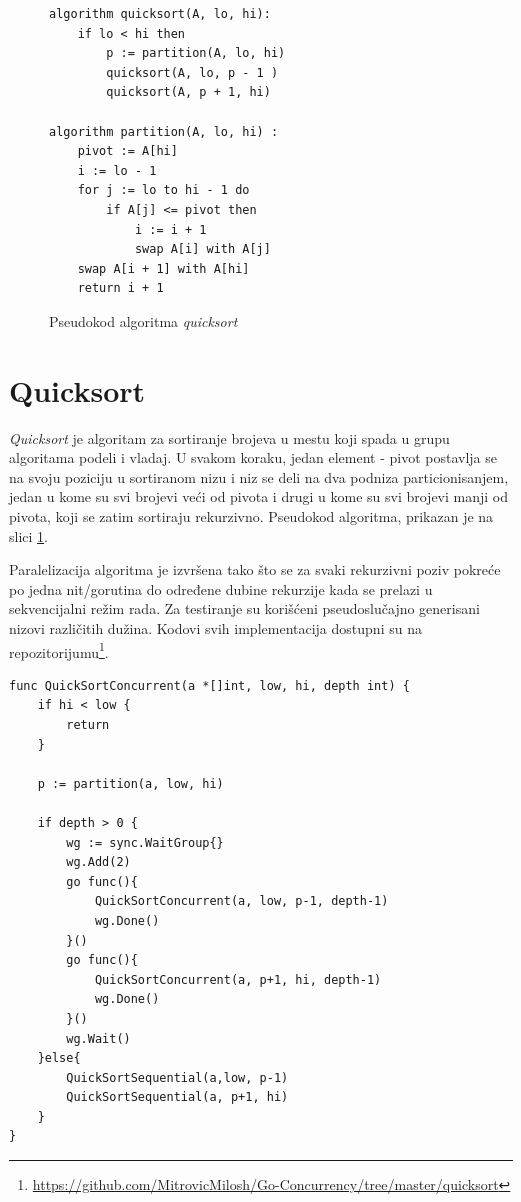 \documentclass[12pt,oneside]{memoir}
\begin{document}
\begin{figure}
\begin{center}

\begin{Verbatim}[fontsize=\small]
algorithm quicksort(A, lo, hi):
    if lo < hi then
        p := partition(A, lo, hi)
        quicksort(A, lo, p - 1 )
        quicksort(A, p + 1, hi)

algorithm partition(A, lo, hi) :
    pivot := A[hi]
    i := lo - 1    
    for j := lo to hi - 1 do
        if A[j] <= pivot then
            i := i + 1
            swap A[i] with A[j]
    swap A[i + 1] with A[hi]
    return i + 1
\end{Verbatim}

\caption{Pseudokod algoritma \textit{quicksort}}
\label{fig:qs_pseudo}
\end{center}
\end{figure}

\section{Quicksort}
\textit{Quicksort} je algoritam za sortiranje brojeva u mestu koji spada u grupu algoritama podeli i vladaj. U svakom koraku, jedan element - pivot postavlja se na svoju poziciju u sortiranom nizu i niz se deli na dva podniza particionisanjem, jedan u kome su svi brojevi veći od pivota i drugi u kome su svi brojevi manji od pivota, koji se zatim sortiraju rekurzivno.  Pseudokod algoritma, prikazan je na slici \ref{fig:qs_pseudo}. 

Paralelizacija algoritma je izvršena tako što se za svaki rekurzivni poziv pokreće po jedna nit/gorutina do određene dubine rekurzije kada se prelazi u sekvencijalni režim rada. Za testiranje su korišćeni pseudoslučajno generisani nizovi različitih dužina. Kodovi svih implementacija dostupni su na repozitorijumu\footnote{\url{https://github.com/MitrovicMilosh/Go-Concurrency/tree/master/quicksort}}.


\begin{center}
\begin{lstlisting}[caption=Implementacija konkurentne funkcije \textit{quicksort} u jeziku Go,label={lst:qs},  backgroundcolor=\color{background}]
func QuickSortConcurrent(a *[]int, low, hi, depth int) {
	if hi < low {
		return
	}

	p := partition(a, low, hi)

	if depth > 0 {
		wg := sync.WaitGroup{}
		wg.Add(2)
		go func(){
			QuickSortConcurrent(a, low, p-1, depth-1)
			wg.Done()
		}()
		go func(){
			QuickSortConcurrent(a, p+1, hi, depth-1)
			wg.Done()
		}()
		wg.Wait()
	}else{
		QuickSortSequential(a,low, p-1)
		QuickSortSequential(a, p+1, hi)
	}	
}
\end{lstlisting}
\end{center}
\end{document}

